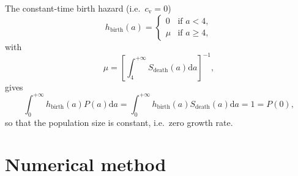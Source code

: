 \documentclass[12pt]{article}
\newcommand{\md}{\mathrm{d}}
\begin{document}
The constant-time birth hazard
(i.e.~$c_{\mathrm{v}} = 0$)
\begin{equation}
  h_{\text{birth}}(a) =
  \begin{cases}
    0 & \text{if $a < 4$}, \\
    \mu & \text{if $a \geq 4$},
  \end{cases}
\end{equation}
with
\begin{equation}
  \mu =
  \left[
    \int_4^{+\infty} S_{\text{death}}(a) \md a
  \right]^{-1},
\end{equation}
gives
\begin{equation}
  \int_0^{+\infty} h_{\text{birth}}(a) P(a) \md a
  = \int_0^{+\infty} h_{\text{birth}}(a) S_{\text{death}}(a) \md a
  = 1
  = P(0),
\end{equation}
so that the population size is constant, i.e.~zero growth rate.


\section{Numerical method}
\end{document}
